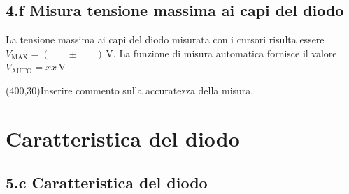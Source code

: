 \documentclass[10pt,a4paper]{article}
\newcommand{\exn}{\phantom{xxx}}
\begin{document}
\subsection*{4.f Misura tensione massima ai capi del diodo}
\par 
La tensione massima ai capi del diodo misurata con i cursori risulta essere
$V_{\mathrm{MAX}}= ( \exn \pm \exn ) \,\mathrm{V}$. La funzione di misura
automatica fornisce il valore $V_{\mathrm{AUTO}}= xx \,\mathrm{V}$

\vspace{0.5cm} 
\framebox(400,30){Inserire commento sulla accuratezza della misura.}



\section{Caratteristica del diodo}
\par

\subsection*{5.c Caratteristica del diodo}
\end{document}
